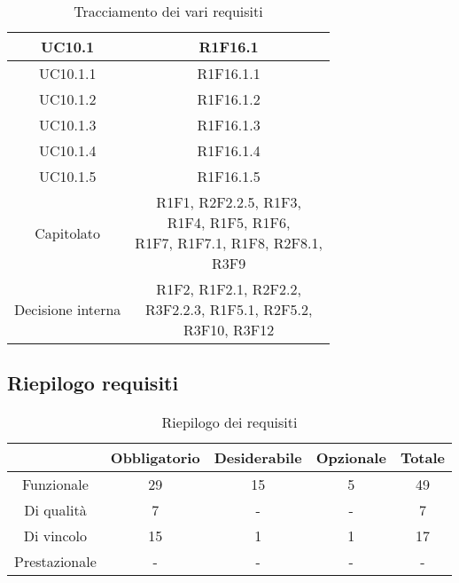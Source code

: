 \begin{table}[H]
\begin{tabular}{c | c}
		UC10.1                                                  & R1F16.1                          \\ \hline
		UC10.1.1                                                & R1F16.1.1                        \\ \hline
		UC10.1.2                                                & R1F16.1.2                        \\ \hline
		UC10.1.3                                                & R1F16.1.3                        \\ \hline
		UC10.1.4                                                & R1F16.1.4                        \\ \hline
		UC10.1.5                                                & R1F16.1.5                        \\ \hline
		Capitolato                                              & \Shortunderstack{R1F1, R2F2.2.5, R1F3,\\ R1F4, R1F5, R1F6, \\R1F7, R1F7.1, R1F8, R2F8.1, \\R3F9}  \\ \hline
		Decisione interna                                       & \Shortunderstack{R1F2,  R1F2.1, R2F2.2,\\ R3F2.2.3, R1F5.1, R2F5.2,\\ R3F10, R3F12\\} \\
	\end{tabular}
	\caption{Tracciamento dei vari requisiti}
\end{table}

\subsection{Riepilogo requisiti} \label{subsection: riepilogo}

\begin{table}[H]
	\centering
	\renewcommand{\arraystretch}{1.8}
	\begin{tabular}{c | c | c | c | c}
		\rowcolor[HTML]{125E28}
		\multicolumn{1}{c}{\color[HTML]{FFFFFF} \textbf{Tipologia}}    &
		\multicolumn{1}{c}{\color[HTML]{FFFFFF} \textbf{Obbligatorio}} &
		\multicolumn{1}{c}{\color[HTML]{FFFFFF} \textbf{Desiderabile}} &
		\multicolumn{1}{c}{\color[HTML]{FFFFFF} \textbf{Opzionale}}    &
		\multicolumn{1}{c}{\color[HTML]{FFFFFF} \textbf{Totale}}                          \\
		\hline
		Funzionale                                                     & 29 & 15 & 5 & 49 \\ \hline
		Di qualità                                                     & 7  & -  & - & 7  \\ \hline
		Di vincolo                                                     & 15 & 1  & 1 & 17 \\ \hline
		Prestazionale                                                  & -  & -  & - & -  \\
	\end{tabular}
	\caption{Riepilogo dei requisiti}
\end{table}